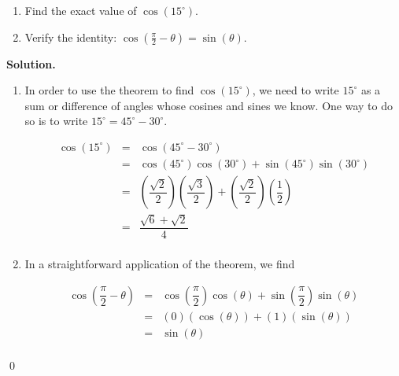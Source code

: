\documentclass{ximera}
\begin{document}
\begin{example} \label{cosinesumdiffex}  $~$

\begin{enumerate}

\item Find the exact value of $\cos\left(15^{\circ}\right)$.

\item  Verify the identity:  $\cos\left(\frac{\pi}{2} - \theta\right) = \sin(\theta)$.

\end{enumerate}

{\bf Solution.}

\begin{enumerate}

\item In order to use the theorem to find $\cos\left(15^{\circ}\right)$, we need to write $15^{\circ}$ as a sum or difference of angles whose cosines and sines we know.  One way to do so is to write $15^{\circ} = 45^{\circ} - 30^{\circ}$.

\vspace{-.1in}

\[ \begin{array}{rcl}

\cos\left(15^{\circ}\right) & = & \cos\left(45^{\circ} - 30^{\circ} \right) \\ [2pt]
                            & = & \cos\left(45^{\circ}\right)\cos\left(30^{\circ} \right) + \sin\left(45^{\circ}\right)\sin\left(30^{\circ} \right) \\ [2pt]
                            & = & \left( \dfrac{\sqrt{2}}{2} \right)\left( \dfrac{\sqrt{3}}{2} \right)  +  \left( \dfrac{\sqrt{2}}{2} \right)\left( \dfrac{1}{2} \right)\\ [15pt]
														& = &  \dfrac{\sqrt{6}+ \sqrt{2}}{4} \\ 
\end{array} \]

\item  In a straightforward application of  the theorem, we find

\[ \begin{array}{rcl}

\cos\left(\dfrac{\pi}{2} - \theta\right) & = & \cos\left(\dfrac{\pi}{2}\right)\cos\left(\theta\right) + \sin\left(\dfrac{\pi}{2}\right)\sin\left(\theta \right) \\ [10pt]
                            & = & \left( 0 \right)\left( \cos(\theta) \right)  +  \left( 1 \right)\left( \sin(\theta) \right) \\ [4pt]
														& = & \sin(\theta)    \\
\end{array} \]


\end{enumerate}

\vspace{-.25in}

\qed

\end{example}
\end{document}
